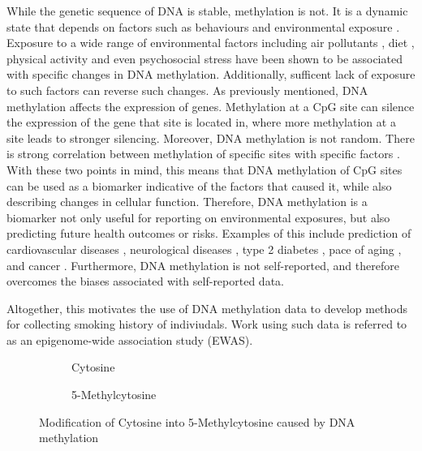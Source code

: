 \documentclass{article}
\begin{document}
While the genetic sequence of DNA is stable, methylation is not. It is a dynamic state that depends on factors such as behaviours and environmental exposure \cite{greenberg2019diverse}. Exposure to a wide range of environmental factors including air pollutants \cite{martin2018environmental}, diet \cite{ma2020whole}, physical activity and even psychosocial stress \cite{opsasnick2024epigenome} have been shown to be associated with specific changes in DNA methylation. Additionally, sufficent lack of exposure to such factors can reverse such changes. As previously mentioned, DNA methylation affects the expression of genes. Methylation at a CpG site can silence the expression of the gene that site is located in, where more methylation at a site leads to stronger silencing. Moreover, DNA methylation is not random. There is strong correlation between methylation of specific sites with specific factors \cite{ewasatlas}. With these two points in mind, this means that DNA methylation of CpG sites can be used as a biomarker indicative of the factors that caused it, while also describing changes in cellular function. Therefore, DNA methylation is a biomarker not only useful for reporting on environmental exposures, but also predicting future health outcomes or risks. Examples of this include prediction of cardiovascular diseases \cite{cameron2023dna}, neurological diseases \cite{cells11213439}, type 2 diabetes \cite{cheng2023development}, pace of aging \cite{10.7554/eLife.73420}, and cancer \cite{luo2020circulating}. Furthermore, DNA methylation is not self-reported, and therefore overcomes the biases associated with self-reported data.

Altogether, this motivates the use of DNA methylation data to develop methods for collecting smoking history of indiviudals. Work using such data is referred to as an epigenome-wide association study (EWAS).

\begin{figure}
    \begin{subfigure}{0.49\textwidth}
        \centering
        \hspace*{11mm}
        \vspace{3mm}
        \caption{Cytosine}
    \end{subfigure}
    \begin{subfigure}{0.49\textwidth}
        \centering
        \vspace{3mm}
        \caption{5-Methylcytosine}
    \end{subfigure}
    \caption*{Modification of Cytosine into 5-Methylcytosine caused by DNA methylation}
\end{figure}
\end{document}
